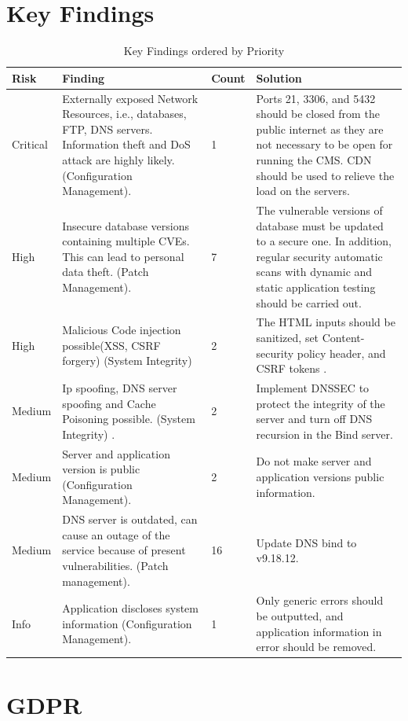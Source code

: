 \section{Key Findings}
\begingroup
\centering
\setlength{\tabcolsep}{6.5pt} %
\renewcommand{\arraystretch}{1.8} %
\begin{longtable}{ |p{1.5cm}| p{6cm}|p{1.3cm}|p{5cm}|}
\caption{Key Findings ordered by Priority}
    \label{table:key_findings}
\hline
\rowcolor{grey!15}
\textbf{Risk}  & \textbf{Finding}& \textbf{Count}& \textbf{Solution}\\
\hline
\cellcolor{red!95} Critical  & Externally exposed Network Resources, i.e., databases, FTP, DNS servers. Information theft and DoS attack are highly likely.
\newline (Configuration Management). & 1 & Ports 21, 3306, and 5432 should be closed from the public internet as they are not necessary to be open for running the CMS. CDN should be used to relieve the load on the servers.
\\
\hline
\cellcolor{red!70} High  & Insecure database versions  containing multiple CVEs. This can lead to personal data theft.
\newline (Patch Management).& 7 & The vulnerable versions of database must be updated to a secure one. In addition, regular security automatic scans with dynamic and static application testing should be carried out.
\\
\hline
\cellcolor{red!70} High  & Malicious Code injection possible(XSS, CSRF forgery) 
\newline (System Integrity)& 2 & The HTML inputs should be sanitized, set Content-security policy header, and CSRF tokens \citep[p.~75]{xss_crsf}.
\\
\hline
\cellcolor{yellow!95} Medium  & Ip spoofing, DNS server spoofing and Cache Poisoning possible.
\newline (System Integrity) .& 2 & Implement DNSSEC to protect the integrity of the server and turn off DNS recursion in the Bind server. \citep[p.~38]{guo2006spoof}
\\
\hline
\cellcolor{yellow!95} Medium  & Server and application version is public 
\newline(Configuration Management).& 2 & Do not make server and application versions public information.
\\
\hline
\cellcolor{yellow!95} Medium  & DNS server is outdated, can cause an outage of the service because of present vulnerabilities.
\newline (Patch management).& 16 & Update DNS bind to v9.18.12.
\\
\hline
\cellcolor{grey!55} Info  & Application discloses system information
\newline (Configuration Management).& 1 & Only generic errors should be outputted, and application information in error should be removed.
\\
\hline
\end{longtable}
\endgroup

\section{GDPR}